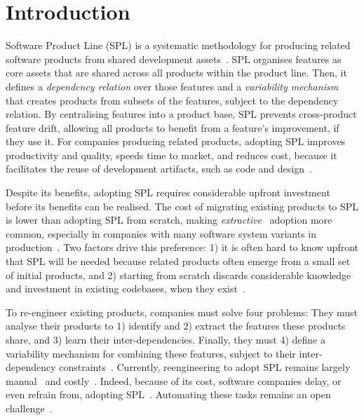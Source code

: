 \section{Introduction}
\label{sec:introduction}

Software Product Line (SPL) is a systematic methodology for producing related software products from shared development assets~\cite{Pohl2005, Linden2007, Fischer2015}.
SPL organises features as core assets that are shared across all products within the product line. Then, it defines a \emph{dependency relation} over those features and a \emph{variability mechanism} that creates products from subsets of the features, subject to the dependency relation.
By centralising features into a product base, SPL prevents cross-product feature drift, allowing all products to benefit from a feature's improvement, if they use it.
For companies producing related products, adopting SPL improves productivity and quality, speeds time to market, and reduces cost, because it facilitates the reuse of development artifacts, such as code and design~\cite{Linden2007,Bastos2015}.

Despite its benefits, adopting SPL requires considerable upfront investment before its benefits can be realised. 
The cost of migrating existing products to SPL is lower than adopting SPL from scratch, making \emph{extractive}~\cite{Krueger2001} adoption more common, especially in companies with many software system variants in production~\cite{Berger2013}. Two factors drive this preference: 1) it is often hard to know upfront that SPL will be needed because related products often emerge from a small set of initial products, and 2)  starting from scratch discards considerable knowledge and investment in existing codebases, when they exist~\cite{Breivold2008,Northrop2012}.

To re-engineer existing products, companies must solve four problems:  They must analyse their products to 1) identify and 2) extract the features these products share, and 3) learn their inter-dependencies. Finally, they must 4) define a variability mechanism for combining these features, subject to their inter-dependency constraints~\cite{Assuncao2017}. 
Currently, reengineering to adopt SPL remains largely manual~\cite{Assuncao2017} and costly~\cite{Bockle2004}. Indeed, because of its cost, software companies delay, or even refrain from, adopting SPL~\cite{Fischer2015}.  Automating these tasks remains an open challenge~\cite{Assuncao2017}.


